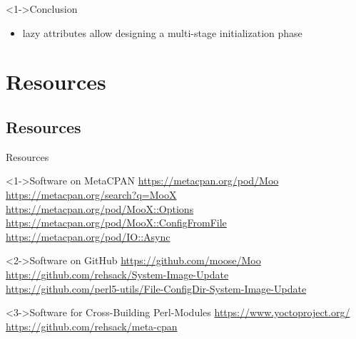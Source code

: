 \documentclass[ngerman,xcolor={table,dvipsnames},smaller,compress,hyperref={bookmarks,colorlinks}]{beamer}%
\begin{document}
\begin{frame}[t,fragile]

\begin{block}<1->{Conclusion}
\begin{itemize}
\item lazy attributes allow designing a multi-stage initialization phase
\begin{itemize}
\end{itemize}
\end{itemize}
\end{block}

\end{frame}

\section{Resources}

\subsection{Resources}

\begin{frame}[t,fragile]{Resources}
\begin{block}<1->{Software on MetaCPAN}
\url{https://metacpan.org/pod/Moo} \\
\url{https://metacpan.org/search?q=MooX} \\
\url{https://metacpan.org/pod/MooX::Options} \\
\url{https://metacpan.org/pod/MooX::ConfigFromFile} \\
\url{https://metacpan.org/pod/IO::Async}
\end{block}

\begin{block}<2->{Software on GitHub}
\url{https://github.com/moose/Moo} \\
\url{https://github.com/rehsack/System-Image-Update} \\
\url{https://github.com/perl5-utils/File-ConfigDir-System-Image-Update}
\end{block}

\begin{block}<3->{Software for Cross-Building Perl-Modules}
\url{https://www.yoctoproject.org/} \\
\url{https://github.com/rehsack/meta-cpan}
\end{block}
\end{frame}
\end{document}
